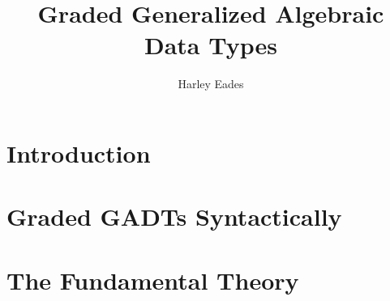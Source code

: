 \documentclass[12pt]{article}
\title{Graded Generalized Algebraic Data Types}
\author{Harley Eades}
\begin{document}
\maketitle

\begin{abstract}
  
\end{abstract}

\tableofcontents

\section{Introduction}
\label{sec:introduction}


\section{Graded GADTs Syntactically}
\label{sec:Graded GADTs Syntactically}


\section{The Fundamental Theory} 
\label{sec:The Fundamental Theory}


\nocite{*}


\appendix
\end{document}
